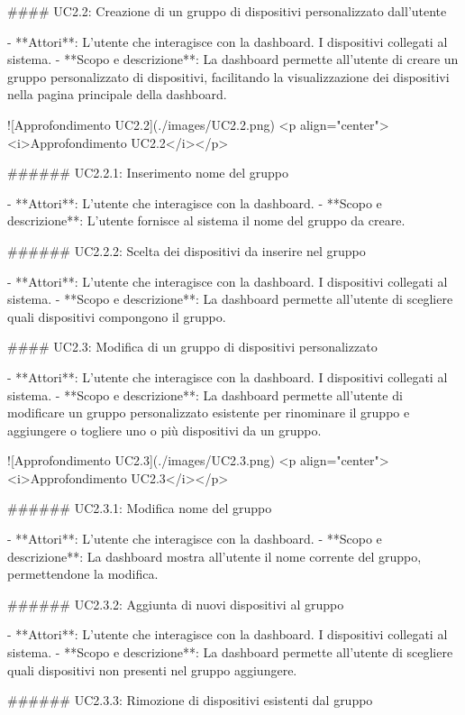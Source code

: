#### UC2.2: Creazione di un gruppo di dispositivi personalizzato dall'utente

-   **Attori**:  
    L'utente che interagisce con la dashboard. I dispositivi collegati al sistema.
-   **Scopo e descrizione**:  
    La dashboard permette all'utente di creare un gruppo personalizzato di dispositivi, facilitando la visualizzazione dei dispositivi nella pagina principale della dashboard.

![Approfondimento UC2.2](./images/UC2.2.png)
<p align="center"><i>Approfondimento UC2.2</i></p>


###### UC2.2.1: Inserimento nome del gruppo

-   **Attori**:  
    L'utente che interagisce con la dashboard.
-   **Scopo e descrizione**:  
    L'utente fornisce al sistema il nome del gruppo da creare.


###### UC2.2.2: Scelta dei dispositivi da inserire nel gruppo

-   **Attori**:  
    L'utente che interagisce con la dashboard. I dispositivi collegati al sistema.
-   **Scopo e descrizione**:  
    La dashboard permette all'utente di scegliere quali dispositivi compongono il gruppo.


#### UC2.3: Modifica di un gruppo di dispositivi personalizzato

-   **Attori**:  
    L'utente che interagisce con la dashboard. I dispositivi collegati al sistema.
-   **Scopo e descrizione**:  
    La dashboard permette all'utente di modificare un gruppo personalizzato esistente per rinominare il gruppo e aggiungere o togliere uno o più dispositivi da un gruppo.

![Approfondimento UC2.3](./images/UC2.3.png)
<p align="center"><i>Approfondimento UC2.3</i></p>


###### UC2.3.1: Modifica nome del gruppo

-   **Attori**:  
    L'utente che interagisce con la dashboard.
-   **Scopo e descrizione**:  
    La dashboard mostra all'utente il nome corrente del gruppo, permettendone la modifica.


###### UC2.3.2: Aggiunta di nuovi dispositivi al gruppo

-   **Attori**:  
    L'utente che interagisce con la dashboard. I dispositivi collegati al sistema.
-   **Scopo e descrizione**:  
    La dashboard permette all'utente di scegliere quali dispositivi non presenti nel gruppo aggiungere.

###### UC2.3.3: Rimozione di dispositivi esistenti dal gruppo

